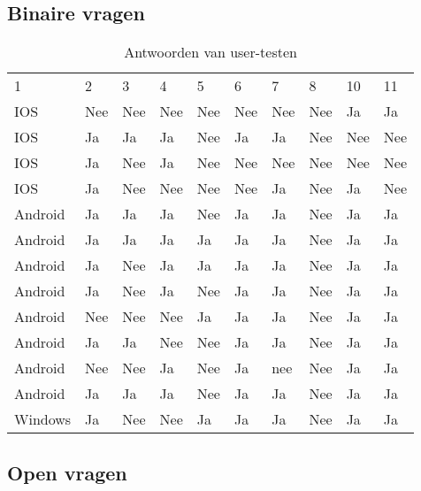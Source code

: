 \subsection{Binaire vragen}
	\begin{table}[H]
		\centering
		\begin{tabular}{llllllllll}
			1 &  2 & 3 & 4 & 5 & 6 & 7 & 8 & 10 &11\\
			IOS & Nee & Nee & Nee & Nee & Nee & Nee & Nee & Ja & Ja \\
			IOS & Ja & Ja & Ja & Nee & Ja & Ja & Nee & Nee & Nee \\
			IOS & Ja & Nee & Ja & Nee & Nee & Nee & Nee & Nee & Nee \\
			IOS & Ja & Nee & Nee & Nee & Nee & Ja & Nee & Ja & Nee \\
			Android & Ja & Ja & Ja & Nee & Ja & Ja & Nee & Ja & Ja \\
			Android & Ja & Ja & Ja & Ja & Ja & Ja & Nee & Ja & Ja \\
			Android & Ja & Nee & Ja & Ja & Ja & Ja & Nee & Ja & Ja \\
			Android & Ja & Nee & Ja & Nee & Ja & Ja & Nee & Ja & Ja \\
			Android & Nee & Nee & Nee & Ja & Ja & Ja & Nee & Ja & Ja \\
			Android & Ja & Ja & Nee & Nee & Ja & Ja & Nee & Ja & Ja \\
			Android & Nee & Nee & Ja & Nee & Ja & nee & Nee & Ja & Ja \\
			Android & Ja & Ja & Ja & Nee & Ja & Ja & Nee & Ja & Ja \\
			Windows & Ja & Nee & Nee & Ja & Ja & Ja & Nee & Ja & Ja \\
		\end{tabular}	
		\caption{Antwoorden van user-testen}
	\end{table}
	
\subsection{Open vragen}
